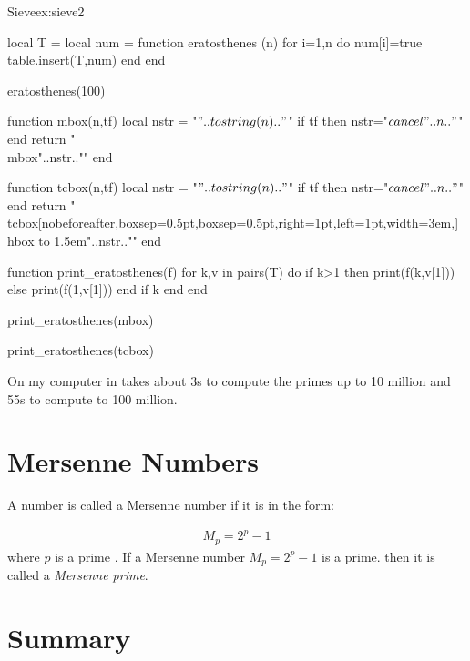 \begin{texexample}{Sieve}{ex:sieve2}
\begin{luacode}
local T = {}
local num = {}
function eratosthenes (n)
   for i=1,n do
     num[i]=true
     table.insert(T,num)
   end
end

eratosthenes(100)

function mbox(n,tf)
  local nstr = "$"..tostring(n).."$"
  if tf then nstr="$\\cancel{"..n.."}$" end
  return "\\mbox{"..nstr.."}"
end

function tcbox(n,tf)
  local nstr = "$"..tostring(n).."$"
  if tf then nstr="$\\cancel{"..n.."}$" end
  return "\\tcbox[nobeforeafter,boxsep=0.5pt,boxsep=0.5pt,right=1pt,left=1pt,width=3em,]{\\hbox to 1.5em{"..nstr.."}}"
end

function print_eratosthenes(f)
  for k,v in pairs(T) do
    if k>1 then print(f(k,v[1])) 
    else
      print(f(1,v[1]))
    end
    if k%
  end
end  


print_eratosthenes(mbox)

print_eratosthenes(tcbox)
\end{luacode}
\end{texexample}


On my computer in takes about 3s to compute the primes up to 10 million and 55s to compute to 100 million.

\section*{Mersenne Numbers}

A number is called a Mersenne number if it is in the form:

\begin{gather}
 M_p = 2^p-1
\end{gather}
where $p$ is a prime . If a Mersenne number $M_p = 2^p-1$ is a prime. then it is
called a \textit{Mersenne prime}.



\section{Summary}




